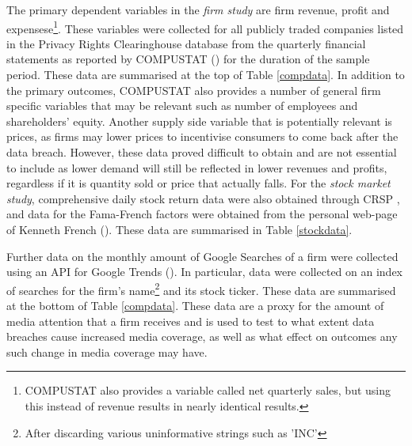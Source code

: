 \documentclass[../Main.tex]{subfiles}
\begin{document}
The primary dependent variables in the \textit{firm study} are firm revenue, profit and expensese\footnote{COMPUSTAT also provides a variable called net quarterly sales, but using this instead of revenue results in nearly identical results.}. These variables were collected for all publicly traded companies listed in the Privacy Rights Clearinghouse database from the quarterly financial statements as reported by COMPUSTAT (\citeyear{compustat}) for the duration of the sample period. These data are summarised at the top of Table \ref{compdata}. In addition to the primary outcomes, COMPUSTAT also provides a number of general firm specific variables that may be relevant such as number of employees and shareholders' equity. Another supply side variable that is potentially relevant is prices, as firms may lower prices to incentivise consumers to come back after the data breach. However, these data proved difficult to obtain and are not essential to include as lower demand will still be reflected in lower revenues and profits, regardless if it is quantity sold or price that actually falls. For the \textit{stock market study}, comprehensive daily stock return data were also obtained through CRSP \citeyear{crsp}, and data for the Fama-French factors were obtained from the personal web-page of Kenneth French (\citeyear{famafrench}). These data are summarised in Table \ref{stockdata}.

Further data on the monthly amount of Google Searches of a firm were collected using an API for Google Trends (\citeyear{googletrends}). In particular, data were collected on an index of searches for the firm's name\footnote{After discarding various uninformative strings such as 'INC'} and its stock ticker. These data are summarised at the bottom of Table \ref{compdata}. These data are a proxy for the amount of media attention that a firm receives and is used to test to what extent data breaches cause increased media coverage, as well as what effect on outcomes any such change in media coverage may have.

\biblio %
\end{document}
